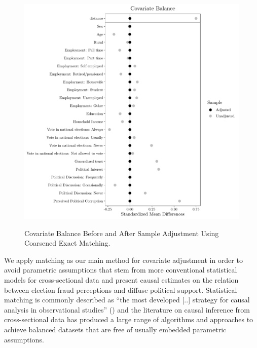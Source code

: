 \documentclass[11pt, ngerman,english,a4]{article}
\begin{document}
\begin{figure}[H]
    \caption{Covariate Balance Before and After Sample Adjustment Using Coarsened Exact Matching.}
    \centering
    \includegraphics[width=0.9\linewidth]{covbalance_cem.pdf}
    \label{fig:balance}
\end{figure}

We apply matching as our main method for covariate adjustment in order to avoid parametric assumptions that stem from more conventional statistical models for cross-sectional data and present causal estimates on the relation between election fraud perceptions and diffuse political support. Statistical matching is commonly described as “the most developed [..] strategy for causal analysis in observational studies” (\citealt{Pearl2010}) and the literature on causal inference from cross-sectional data has produced a large range of algorithms and approaches to achieve balanced datasets that are free of usually embedded  parametric assumptions. 
\end{document}
